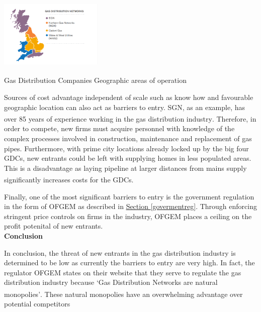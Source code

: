 \documentclass[11pt]{article}		%
\newcommand{\supercite}[1]{\textsuperscript{\cite{#1}}}		%
\newcommand{\sectref}[1]{\hyperref[#1]{Section \ref*{#1}}}     %
\begin{document}
	            
					\begin{floatingfigure}[r]{0.4\textwidth}
				    \centering
			    	\includegraphics[width=0.37\textwidth]{distribution}
				    \caption{Gas Distribution Companies Geographic areas of operation\supercite{sönnichsen_5_2021}}
		    	\label{distrit}
	        	\end{floatingfigure}
	        	
                \hspace*{2ex}Sources of cost advantage independent of scale such as know how and favourable geographic location can also act as barriers to entry. SGN, as an example, has over 85 years of experience working in the gas distribution industry\supercite{SGN_Scotland}. Therefore, in order to compete, new firms must acquire personnel with knowledge of the complex processes involved in construction, maintenance and replacement of gas pipes. Furthermore, with prime city locations already locked up by the big four GDCs, new entrants could be left with supplying homes in less populated areas. This is a disadvantage as laying pipeline at larger distances from mains supply significantly increases costs for the GDCs\supercite{pipecosts}.   \\
                \begin{floatingfigure}[r]{0pt} \end{floatingfigure}
				Finally, one of the most significant barriers to entry is the government regulation in the form of OFGEM as described in \sectref{govermentreg}.  
				Through enforcing stringent price controls on firms in the industry, OFGEM places a ceiling on the profit potenital of new entrants.    \\
	            
			    \textbf{Conclusion}
			    
                In conclusion, the threat of new entrants in the gas distribution industry is determined to be low as currently the barriers to entry are very high. In fact, the regulator OFGEM states on their website that they serve to regulate the gas distribution industry because ‘Gas Distribution Networks are natural monopolies’\supercite{OFGEMquote}. These natural monopolies have an overwhelming advantage over potential competitors
        
\end{document}
